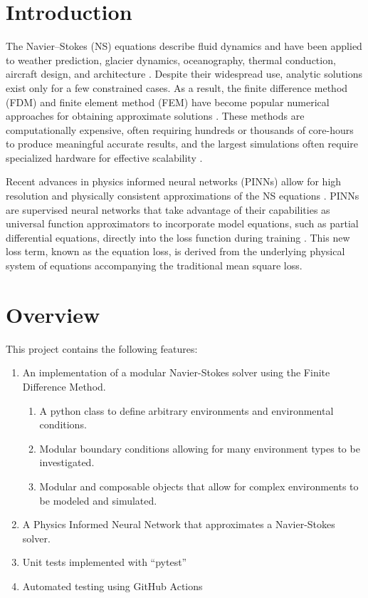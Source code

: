 \section{Introduction}
The Navier–Stokes (NS) equations describe fluid dynamics and have been applied to weather prediction, glacier dynamics, oceanography, thermal conduction, aircraft design, and architecture \cite{chorin1968numerical}. Despite their widespread use, analytic solutions exist only for a few constrained cases. As a result, the finite difference method (FDM) and finite element method (FEM) have become popular numerical approaches for obtaining approximate solutions \cite{Whiteley2017}. These methods are computationally expensive, often requiring hundreds or thousands of core-hours to produce meaningful accurate results, and the largest simulations often require specialized hardware for effective scalability \cite{michalakes2007wrf}. 



Recent advances in physics informed neural networks (PINNs) allow for high resolution and physically consistent approximations of the NS equations \cite{jin2021nsfnets} \cite{baymani2015artificial} \cite{eivazi2022physics}. PINNs are supervised neural networks that take advantage of their capabilities as universal function approximators to incorporate model equations, such as partial differential equations, directly into the loss function during training \cite{Raissi2019}. This new loss term, known as the equation loss, is derived from the underlying physical system of equations accompanying the traditional mean square loss.

\section{Overview}
This project contains the following features:

\begin{enumerate}
    \item An implementation of a modular Navier-Stokes solver using the Finite Difference Method.
        \begin{enumerate}
            \item A python class to define arbitrary environments and environmental conditions.
            \item Modular boundary conditions allowing for many environment types to be investigated.
            \item Modular and composable objects that allow for complex environments to be modeled and simulated.
        \end{enumerate}
    \item A Physics Informed Neural Network that approximates a Navier-Stokes solver.
    \item Unit tests implemented with ``pytest''
    \item Automated testing using GitHub Actions
\end{enumerate}